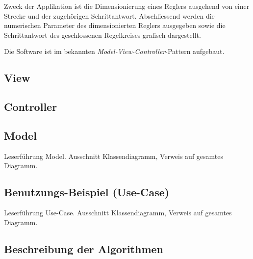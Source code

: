 
Zweck  der Applikation  ist die  Dimensionierung eines  Reglers ausgehend  von
einer  Strecke  und  der  zugeh\"origen  Schrittantwort. Abschliessend  werden
die  numerischen Parameter  des dimensionierten  Reglers ausgegeben  sowie die
Schrittantwort des geschlossenen Regelkreises grafisch dargestellt.

Die   Software    ist   im    bekannten   \emph{Model-View-Controller}-Pattern
aufgebaut.


\subsection{View}



\subsection{Controller}



\subsection{Model}

Leserf\"uhrung Model.
Ausschnitt Klassendiagramm, Verweis auf gesamtes Diagramm.




\subsection{Benutzungs-Beispiel (Use-Case)}

Leserf\"uhrung Use-Case.
Ausschnitt Klassendiagramm, Verweis auf gesamtes Diagramm.




\subsection{Beschreibung der Algorithmen}


